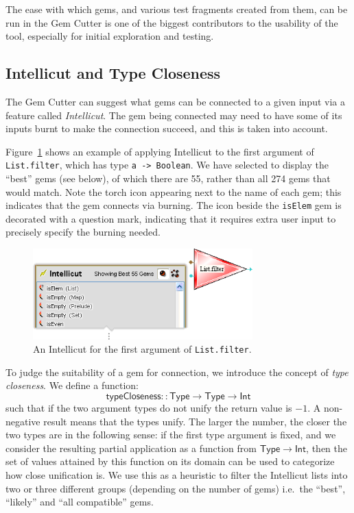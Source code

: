 \documentclass[preprint]{sigplanconf}
\begin{document}
The ease with which gems, and various test fragments created from
them, can be run in the Gem Cutter is one of the biggest contributors
to the usability of the tool, especially for initial exploration and
testing.

\subsection{Intellicut and Type Closeness}
\label{sec:intellicut}

The Gem Cutter can suggest what gems can be connected to a given input
via a feature called {\it Intellicut}. The gem being connected may
need to have some of its inputs burnt to make the connection succeed,
and this is taken into account.

Figure~\ref{fig:intellicut} shows an example of applying Intellicut to the
first argument of {\tt List.filter}, which has type {\tt a -> Boolean}. We have
selected to display the ``best'' gems (see below), of which there are
55, rather than all 274 gems that would match. Note the torch icon appearing next 
to the name of each gem; this indicates that the gem connects via burning. 
The icon beside the {\tt isElem} gem is decorated with a question mark, indicating
that it requires extra user input to precisely specify the burning needed.

\begin{figure}[htb]
  \centering
  \includegraphics[width=20pc]{intellicut.png}
  \caption{An Intellicut for the first argument of {\tt List.filter}.}
  \label{fig:intellicut}
\end{figure}

To judge the suitability of a gem for connection, we introduce the concept of 
{\it type closeness}. We define a function:
\begin{equation*}
\mathsf{typeCloseness :: Type \rightarrow Type \rightarrow Int}
\end{equation*}
such that if the two argument types do not unify the return value is
$-1$. A non-negative result means that the types unify. The larger the
number, the closer the two types are in the following sense: if the
first type argument is fixed, and we consider the resulting partial
application as a function from $\mathsf{Type \rightarrow Int}$, then
the set of values attained by this function on its domain can be used
to categorize how close unification is. We use this as a heuristic to
filter the Intellicut lists into two or three different groups
(depending on the number of gems) i.e.\ the ``best'', ``likely'' and
``all compatible'' gems.
\end{document}
